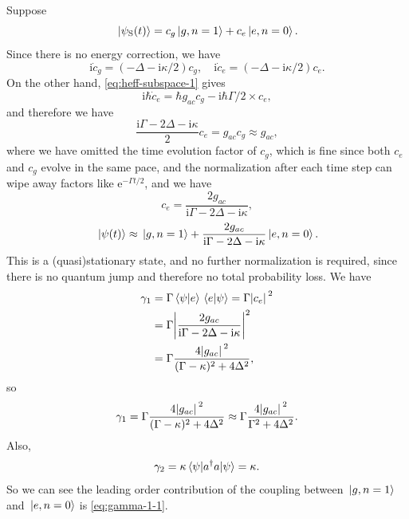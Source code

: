 \documentclass[hyperref, a4paper]{article}
\newcommand*{\ii}{\mathrm{i}}
\newcommand*{\ee}{\mathrm{e}}
\begin{document}
\begin{itemize}
Suppose 
\[
    \ket*{\psi_\text{S}(t)} = c_g \ket*{g, n=1} + c_e \ket*{e, n=0}.
\]
Since there is no energy correction, we have 
\[
    \ii \dot{c}_g = (- \Delta - \ii \kappa / 2) c_g, \quad \ii \dot{c}_e = (- \Delta - \ii \kappa / 2) c_e.
\]
On the other hand, \eqref{eq:heff-subspace-1} gives 
\[
    \ii \hbar \dot{c}_e = \hbar g_{ac} c_g - \ii \hbar \Gamma / 2 \times c_e,
\]
and therefore we have 
\[
    \frac{\ii \Gamma - 2 \Delta - \ii \kappa}{2 } c_e = g_{ac} c_g \approx g_{ac},
\]
where we have omitted the time evolution factor of $c_g$, which is fine since both $c_e$ and $c_g$ evolve in 
the same pace, and the normalization after each time step can wipe away factors like $\ee^{- \Gamma t / 2}$,
and we have 
\[
    c_e = \frac{2 g_{ac}}{\ii \Gamma - 2 \Delta - \ii \kappa},
\]
\begin{equation}
    \ket*{\psi(t)} \approx \ket*{g, n=1} + \frac{2 g_{ac}}{\ii \Gamma - 2 \Delta - \ii \kappa} \ket*{e, n=0}.
\end{equation}
This is a (quasi)stationary state, and no further normalization is required, since there is no quantum jump 
and therefore no total probability loss. We have 
\[
    \begin{aligned}
        \gamma_1 &= \Gamma \braket*{\psi}{e} \braket*{e}{\psi} = \Gamma \abs*{c_e}^2 \\
        &= \Gamma \abs{\frac{2 g_{ac}}{\ii \Gamma - 2 \Delta - \ii \kappa}}^2 \\
        &= \Gamma \frac{4 \abs*{g_{ac}}^2}{(\Gamma - \kappa)^2 + 4 \Delta^2 },
    \end{aligned}
\]
so
\begin{equation}
    \gamma_1 = \Gamma \frac{4 \abs*{g_{ac}}^2}{(\Gamma - \kappa)^2 + 4 \Delta^2 } \approx \Gamma \frac{4 \abs*{g_{ac}}^2}{\Gamma^2 + 4 \Delta^2 }.
    \label{eq:gamma-1-1}
\end{equation}
Also, 
\begin{equation}
    \gamma_2 = \kappa \expval{a^\dagger a}{\psi} = \kappa.
\end{equation}
So we can see the leading order contribution of the coupling between $\ket*{g, n=1}$ and $\ket*{e, n=0}$ is \eqref{eq:gamma-1-1}.


\end{itemize}
\end{document}
